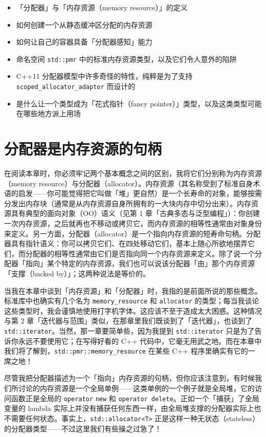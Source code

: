 \begin{itemize}
\item 「分配器」与「内存资源（memory resource）」的定义
\item 如何创建一个从静态缓冲区分配的内存资源
\item 如何让自己的容器具备「分配器感知」能力
\item 命名空间 \texttt{std::\allowbreak{}pmr} 中的标准内存资源类型，以及它们令人意外的陷阱
\item C++11 分配器模型中许多奇怪的特性，纯粹是为了支持 \texttt{scoped\_\allowbreak{}allocator\_\allowbreak{}adaptor} 而设计的
\item 是什么让一个类型成为「花式指针（fancy pointer）」类型，以及这类类型可能在哪些地方派上用场
\end{itemize}

\section{分配器是内存资源的句柄}

在阅读本章时，你必须牢记两个基本概念之间的区别，我将它们分别称为内存资源（memory resource）与分配器（allocator）。内存资源（其名称受到了标准自身术语的启发——你可能觉得把它叫做「堆」更自然）是一个长寿命的对象，能够按需分发出内存块（通常是从内存资源自身所拥有的一大块内存中切分出来）。内存资源具有典型的面向对象（OO）语义（见第 1 章「古典多态与泛型编程」）：你创建一次内存资源，之后就再也不移动或拷贝它，而内存资源的相等性通常由对象身份来定义。另一方面，分配器（allocator）是一个指向内存资源的短寿命句柄。分配器具有指针语义：你可以拷贝它们、在四处移动它们，基本上随心所欲地摆弄它们，而分配器的相等性通常由它们是否指向同一个内存资源来定义。除了说一个分配器「指向」某个特定的内存资源，我们也可以说该分配器「由」那个内存资源「支撑（backed by）」；这两种说法是等价的。

当我在本章中谈到「内存资源」和「分配器」时，我指的是前面所说的那些概念。标准库中也确实有几个名为 \texttt{memory\_\allowbreak{}resource} 和 \texttt{allocator} 的类型；每当我谈论这些类型时，我会谨慎地使用打字机字体。这应该不至于造成太大困惑。这种情况与第 2 章「迭代器与范围」类似，在那章里我们既谈到了「迭代器」，也谈到了 \texttt{std::\allowbreak{}iterator}。当然，那一章要简单些，因为我提到 \texttt{std::\allowbreak{}iterator} 只是为了告诉你永远不要使用它；在写得好看的 C++ 代码中，它毫无用武之地。而在本章中我们将了解到，\texttt{std::\allowbreak{}pmr::\allowbreak{}memory\_\allowbreak{}resource} 在某些 C++ 程序里确实有它的一席之地！

尽管我把分配器描述为一个「指向」内存资源的句柄，但你应该注意到，有时候我们所讨论的内存资源是一个全局单例——这类单例的一个例子就是全局堆，它的访问函数正是全局的 \texttt{operator} \texttt{new} 和 \texttt{operator delete}。正如一个「捕获」了全局变量的 lambda 实际上并没有捕获任何东西一样，由全局堆支撑的分配器实际上也不需要任何状态。事实上，\texttt{std::\allowbreak{}allocator<\allowbreak{}T>\allowbreak{}} 正是这样一种无状态（stateless）的分配器类型——不过这里我们有些操之过急了！

